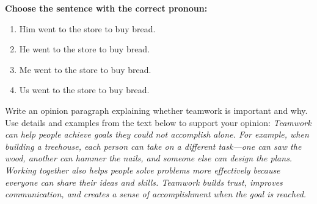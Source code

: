 \documentclass[12pt]{article}
\begin{document}
\begin{tcolorbox}[colframe=black!50, colback=white, title=Question 9]
\textbf{Choose the sentence with the correct pronoun:}  
\begin{enumerate}[label=(\Alph*)]
\item Him went to the store to buy bread.  
\item He went to the store to buy bread.  
\item Me went to the store to buy bread.  
\item Us went to the store to buy bread.  
\end{enumerate}
\end{tcolorbox}

\begin{tcolorbox}[colframe=black!50, colback=white, title=Question 10: Writing Performance Task]
Write an opinion paragraph explaining whether teamwork is important and why. Use details and examples from the text below to support your opinion:  
\textit{Teamwork can help people achieve goals they could not accomplish alone. For example, when building a treehouse, each person can take on a different task—one can saw the wood, another can hammer the nails, and someone else can design the plans. Working together also helps people solve problems more effectively because everyone can share their ideas and skills. Teamwork builds trust, improves communication, and creates a sense of accomplishment when the goal is reached.}

\vspace{2em}
\underline{\hspace{15.8cm}}  
    \\[0.8cm] \underline{\hspace{15.8cm}}  
    \\[0.8cm] \underline{\hspace{15.8cm}}  
    \\[0.8cm] \underline{\hspace{15.8cm}} 
     \\[0.8cm] \underline{\hspace{15.8cm}}  
    \\[0.8cm] \underline{\hspace{15.8cm}}  
    \\[0.8cm] \underline{\hspace{15.8cm}}  
     \\[0.8cm] \underline{\hspace{15.8cm}}  
    \\[0.8cm] \underline{\hspace{15.8cm}}  
\end{tcolorbox}
\end{document}
